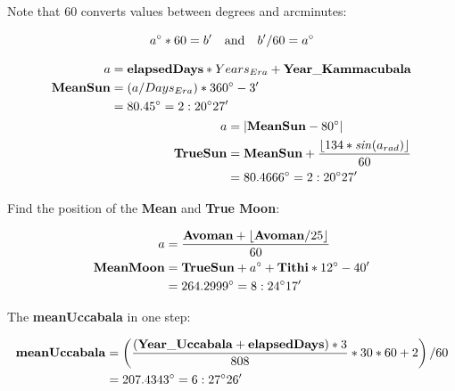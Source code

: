 \documentclass[11pt,oneside]{memoir-article}
\begin{document}
Note that 60 converts values between degrees and arcminutes: 

\[ a^\circ*60=b^\prime \quad \text{and} \quad b^\prime/60 = a^\circ \]

\clearpage

\cheatsheetPar

\begin{align}
\begin{split}
                      a &= \mathbf{elapsedDays} * Years_{Era} + \mathbf{Year\_Kammacubala}\\
       \mathbf{MeanSun} &= (a / Days_{Era}) * 360^\circ - 3^\prime\\
                        &= 80.45^\circ = 2:20^\circ 27^\prime
\end{split}\\
\begin{split}
                         a &= | \mathbf{MeanSun} - 80^\circ | \\
          \mathbf{TrueSun} &= \mathbf{MeanSun} + \frac{\lfloor 134 * \mathit{sin}(a_{rad}) \rfloor}{60}\\
                           &= 80.4666^\circ = 2:20^\circ 27^\prime
\end{split}
\end{align}

Find the position of the \textbf{Mean} and \textbf{True Moon}:


\begin{align}
\begin{split}
                  a &= \frac{\mathbf{Avoman} + \lfloor \mathbf{Avoman} / 25 \rfloor}{60}\\
  \mathbf{MeanMoon} &= \mathbf{TrueSun} + a^\circ + \mathbf{Tithi} * 12^\circ - 40^\prime\\
                    &= 264.2999^\circ = 8:24^\circ 17^\prime
\end{split}
\end{align}

The \textbf{meanUccabala} in one step:

\begin{align}
\begin{split}
  \mathbf{meanUccabala} &= \left( \frac{(\mathbf{Year\_Uccabala} + \mathbf{elapsedDays}) * 3}{808} * 30 * 60 + 2 \right) / 60\\
                        &= 207.4343^\circ = 6:27^\circ 26^\prime
\end{split}
\end{align}
\end{document}
